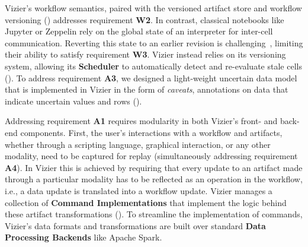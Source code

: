 Vizier's workflow semantics, paired with the versioned artifact store and workflow versioning () addresses requirement \textbf{W2}. %
In contrast, classical notebooks like Jupyter or Zeppelin rely on the global state of an interpreter for inter-cell communication.
Reverting this state to an earlier revision is challenging~\cite{zelnicki:2017:nodebook}, limiting their ability to satisfy requirement \textbf{W3}.
Vizier instead relies on its versioning system, allowing its \textbf{Scheduler} to automatically detect and re-evaluate stale cells ().
To address requirement \textbf{A3}, we designed a light-weight uncertain data model that is implemented in Vizier in the form of \textit{caveats}, annotations on data that indicate uncertain values and rows  ().

Addressing requirement \textbf{A1} requires modularity in both Vizier's front- and back-end components.
First, the user's interactions with a workflow and artifacts, whether through a scripting language, graphical interaction, or any other modality, need to be captured for replay (simultaneously addressing requirement \textbf{A4}). In Vizier this is achieved by requiring that every update to an artifact made through a particular modality has to be reflected as an operation in the workflow, i.e., a data update is translated into a workflow update.
Vizier manages a collection of \textbf{Command Implementations} that implement the logic behind these artifact transformations ().
To streamline the implementation of commands, Vizier's data formats and transformations are built over standard \textbf{Data Processing Backends} like Apache Spark.


